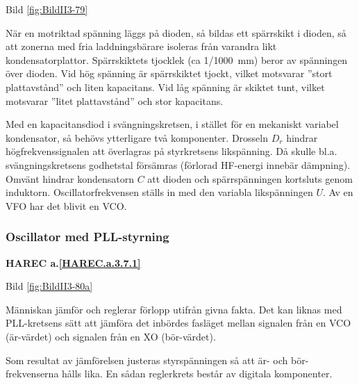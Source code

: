Bild \ref{fig:BildII3-79}

När en motriktad spänning läggs på dioden, så bildas ett spärrskikt i
dioden, så att zonerna med fria laddningsbärare isoleras från varandra
likt kondensatorplattor. Spärrskiktets tjocklek (ca 1/1000~mm) beror
av spänningen över dioden. Vid hög spänning är spärrskiktet tjockt,
vilket motsvarar ''stort plattavstånd'' och liten kapacitans. Vid låg
spänning är skiktet tunt, vilket motsvarar ''litet plattavstånd'' och
stor kapacitans.

Med en kapacitansdiod i svängningskretsen, i stället för en mekaniskt
variabel kondensator, så behövs ytterligare två komponenter. Drosseln
\(D_r\) hindrar högfrekvenssignalen att överlagras på styrkretsens
likspänning. Då skulle bl.a. svängningskretsens godhetstal försämras
(förlorad HF-energi innebär dämpning). Omvänt hindrar kondensatorn
\(C\) att dioden och spärrspänningen kortsluts genom
induktorn. Oscillatorfrekvensen ställs in med den variabla
likspänningen \(U\). Av en VFO har det blivit en VCO.

\subsubsection{Oscillator med PLL-styrning}
\textbf{HAREC a.\ref{HAREC.a.3.7.1}\label{myHAREC.a.3.7.1}}

Bild \ref{fig:BildII3-80a}

Människan jämför och reglerar förlopp utifrån givna fakta. Det kan
liknas med PLL-kretsens sätt att jämföra det inbördes fasläget mellan
signalen från en VCO (är-värdet) och signalen från en XO (bör-värdet).

Som resultat av jämförelsen justeras styrspänningen så att är- och
bör-frekvenserna hålls lika. En sådan reglerkrets består av digitala
komponenter.

